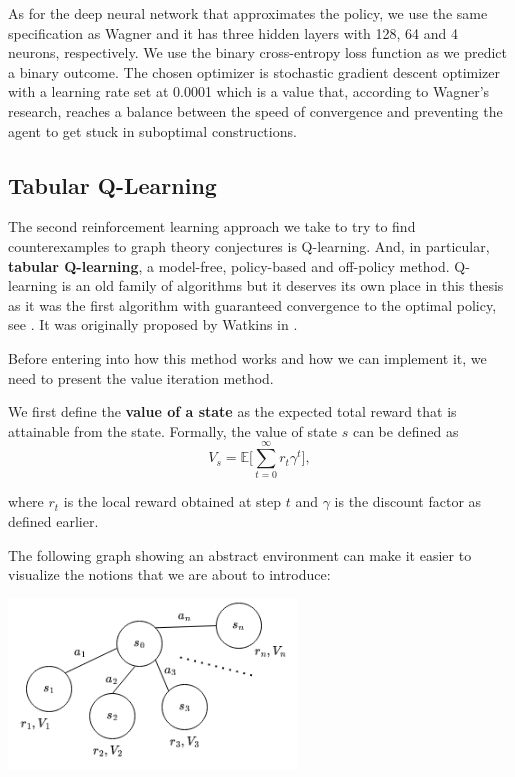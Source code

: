 \documentclass[11pt]{article}
\theoremstyle{definition}
\begin{document}
As for the deep neural network that approximates the policy, we use the same specification as Wagner and it has three hidden layers with 128, 64 and 4 neurons, respectively. We use the binary cross-entropy loss function as we predict a binary outcome. The chosen optimizer is stochastic gradient descent optimizer with a learning rate set at 0.0001 which is a value that, according to Wagner's research, reaches a balance between the speed of convergence and preventing the agent to get stuck in suboptimal constructions.

\subsection{Tabular Q-Learning} \label{qlearning}

The second reinforcement learning approach we take to try to find counterexamples to graph theory conjectures is Q-learning. And, in particular, \textbf{tabular Q-learning}, a model-free, policy-based and off-policy method. Q-learning is an old family of algorithms but it deserves its own place in this thesis as it was the first algorithm with guaranteed convergence to the optimal policy, see \cite{watkins:dayan}. It was originally proposed by Watkins in \cite{watkins}.

Before entering into how this method works and how we can implement it, we need to present the value iteration method.

We first define the \textbf{value of a state} as the expected total reward that is attainable from the state. Formally, the value of state $s$ can be defined as
\begin{equation*}
    V_s = \mathbb{E} \big[ \sum_{t=0}^{\infty} r_t \gamma^t],
\end{equation*}

where $r_t$ is the local reward obtained at step $t$ and $\gamma$ is the discount factor as defined earlier. 

The following graph showing an abstract environment can make it easier to visualize the notions that we are about to introduce: 

\begin{center}
    \centering
    \includegraphics[width=\textwidth, height=4.5cm, keepaspectratio=true]{images/deterministic_env.png}
    \label{fig:det_env}
\end{center}
\end{document}
